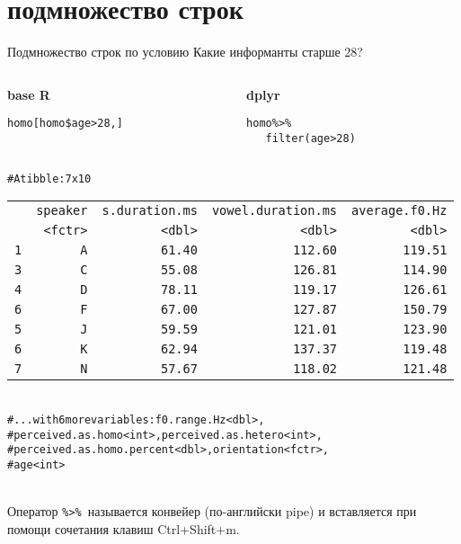 \section{подмножество строк}
\begin{frame}{Подмножество строк по условию}
\noindent Какие информанты старше 28?\\ \vfill
\begin{columns}[T] 
\begin{column}{.48\textwidth}
\textbf{base R}\\
\scriptsize
\begin{alltt}
homo[homo\$age > 28, ]
\end{alltt}
\normalsize
\end{column}
\hfill
\begin{column}{.48\textwidth}
\textbf{dplyr}\\
\scriptsize
\begin{alltt}
homo \alert{\%>\%}\\ 
\ \ \ \alert{filter(}age > 28\alert{)}
\end{alltt}
\normalsize
\end{column}
\end{columns}
\hfill
\scriptsize
\begin{alltt}
\# A tibble: 7 x 10\\
\begin{tabular}{rrrrr}
 & speaker & s.duration.ms & vowel.duration.ms & average.f0.Hz \\ 
 & <fctr> & <dbl> & <dbl> & <dbl> \\ 
1 & A & 61.40 & 112.60 & 119.51  \\ 
3 & C & 55.08 & 126.81 & 114.90 \\ 
4 & D & 78.11 & 119.17 & 126.61 \\ 
6 & F & 67.00 & 127.87 & 150.79 \\ 
5 & J & 59.59  &  121.01  & 123.90  \\ 
6 & K & 62.94 & 137.37 & 119.48 \\ 
7 & N & 57.67 & 118.02 & 121.48 \\ 
\end{tabular}
\\
\# ... with 6 more variables: f0.range.Hz <dbl>,\\
\#   perceived.as.homo <int>, perceived.as.hetero <int>,\\
\#   perceived.as.homo.percent <dbl>, orientation <fctr>,\\
\#   age <int>
\end{alltt}
\normalsize
\hfill\\
\noindent Оператор \scriptsize\texttt{\alert{\%>\%}}\normalsize\ называется конвейер (по-английски pipe) и вставляется при помощи сочетания клавиш \alert{Ctrl+Shift+m}.\bigskip
\end{frame}

